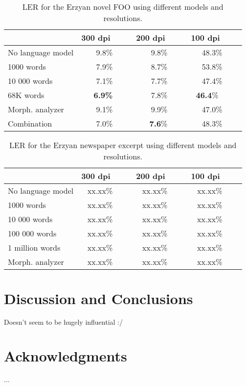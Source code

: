 \documentclass[b5paper]{article}
\begin{document}
\begin{table}[!htb]
\begin{center}
\begin{tabular}{lrrr}
\hline 
                  & 300 dpi~~~~ & 200 dpi~~~~ & 100 dpi~~~~ \\
\hline 
No language model &  9.8\%~~~~   &  9.8\%~~~~   & 48.3\%~~~~   \\
1000 words        &  7.9\%~~~~   &  8.7\%~~~~   & 53.8\%~~~~   \\
10 000 words      &  7.1\%~~~~   &   7.7\%~~~~   & 47.4\%~~~~   \\
68K words         &  {\bf 6.9\%}~~~~   &  7.8\%~~~~   & {\bf 46.4}\%~~~~~\\
Morph. analyzer   &  9.1\%~~~~   &  9.9\%~~~~   & 47.0\%~~~~   \\
Combination       &  7.0\%~~~~   &  {\bf 7.6}\%~~~~   & 48.3\%~~~~   \\
\hline 
\end{tabular}
\caption{LER for the Erzyan novel FOO using different models and resolutions.}\label{fin-news-res}
\end{center}
\end{table}


\begin{table}[!htb]
\begin{center}
\begin{tabular}{lrrr}
\hline 
                  & 300 dpi~~~~ & 200 dpi~~~~ & 100 dpi~~~~ \\
\hline 
No language model & xx.xx\%~~~~   & xx.xx\%~~~~   & xx.xx\%~~~~   \\
1000 words        & xx.xx\%~~~~   & xx.xx\%~~~~   & xx.xx\%~~~~   \\
10 000 words      & xx.xx\%~~~~   & xx.xx\%~~~~   & xx.xx\%~~~~   \\
100 000 words     & xx.xx\%~~~~   & xx.xx\%~~~~   & xx.xx\%~~~~   \\
1 million words   & xx.xx\%~~~~   & xx.xx\%~~~~   & xx.xx\%~~~~   \\
Morph. analyzer   & xx.xx\%~~~~   & xx.xx\%~~~~   & xx.xx\%~~~~   \\
\hline 
\end{tabular}
\caption{LER for the Erzyan newspaper excerpt using different models and resolutions.}\label{myv-news-res}
\end{center}
\end{table}

\section{Discussion and Conclusions}

Doesn't seem to be hugely influential :/
\section*{Acknowledgments}

...



\end{document}
